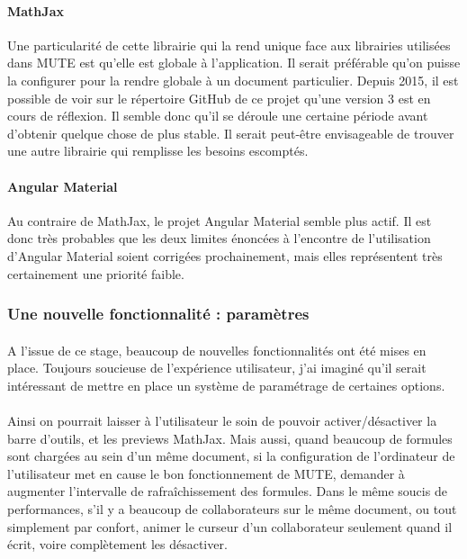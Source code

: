 \documentclass[12pt]{article}
\begin{document}
\paragraph{MathJax}
Une particularité de cette librairie qui la rend unique face aux librairies utilisées dans MUTE est qu'elle est globale à l'application. Il serait préférable qu'on puisse la configurer pour la rendre globale à un document particulier. Depuis 2015, il est possible de voir sur le répertoire GitHub de ce projet qu'une version 3 est en cours de réflexion. Il semble donc qu'il se déroule une certaine période avant d'obtenir quelque chose de plus stable. Il serait peut-être envisageable de trouver une autre librairie qui remplisse les besoins escomptés.

\paragraph{Angular Material}
Au contraire de MathJax, le projet Angular Material semble plus actif. Il est donc très probables que les deux limites énoncées à l'encontre de l'utilisation d'Angular Material soient corrigées prochainement, mais elles représentent très certainement une priorité faible.

\subsubsection{Une nouvelle fonctionnalité : paramètres}
\paragraph{}
A l'issue de ce stage, beaucoup de nouvelles fonctionnalités ont été mises en place. Toujours soucieuse de l'expérience utilisateur, j'ai imaginé qu'il serait intéressant de mettre en place un système de paramétrage de certaines options.
\paragraph{}
Ainsi on pourrait laisser à l'utilisateur le soin de pouvoir activer/désactiver la barre d'outils, et les previews MathJax. Mais aussi, quand beaucoup de formules sont chargées au sein d'un même document, si la configuration de l'ordinateur de l'utilisateur met en cause le bon fonctionnement de MUTE, demander à augmenter l'intervalle de rafraîchissement des formules. Dans le même soucis de performances, s'il y a beaucoup de collaborateurs sur le même document, ou tout simplement par confort, animer le curseur d'un collaborateur seulement quand il écrit, voire complètement les désactiver.
\end{document}
